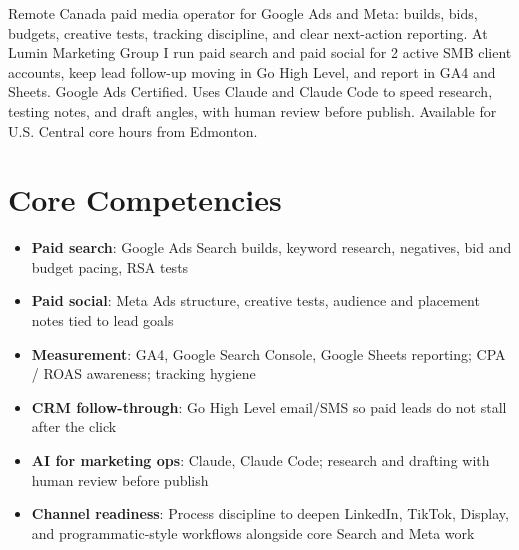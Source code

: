 \documentclass[11pt,a4paper,sans]{moderncv}
\begin{document}
\makecvtitle

\vspace{6pt}
\small{Remote Canada paid media operator for Google Ads and Meta: builds, bids, budgets, creative tests, tracking discipline, and clear next-action reporting. At Lumin Marketing Group I run paid search and paid social for 2 active SMB client accounts, keep lead follow-up moving in Go High Level, and report in GA4 and Sheets. Google Ads Certified. Uses Claude and Claude Code to speed research, testing notes, and draft angles, with human review before publish. Available for U.S. Central core hours from Edmonton.}

\section{Core Competencies}
\vspace{1pt}
\begin{itemize}
\item \textbf{Paid search}: Google Ads Search builds, keyword research, negatives, bid and budget pacing, RSA tests
\item \textbf{Paid social}: Meta Ads structure, creative tests, audience and placement notes tied to lead goals
\item \textbf{Measurement}: GA4, Google Search Console, Google Sheets reporting; CPA / ROAS awareness; tracking hygiene
\item \textbf{CRM follow-through}: Go High Level email/SMS so paid leads do not stall after the click
\item \textbf{AI for marketing ops}: Claude, Claude Code; research and drafting with human review before publish
\item \textbf{Channel readiness}: Process discipline to deepen LinkedIn, TikTok, Display, and programmatic-style workflows alongside core Search and Meta work
\end{itemize}
\end{document}
